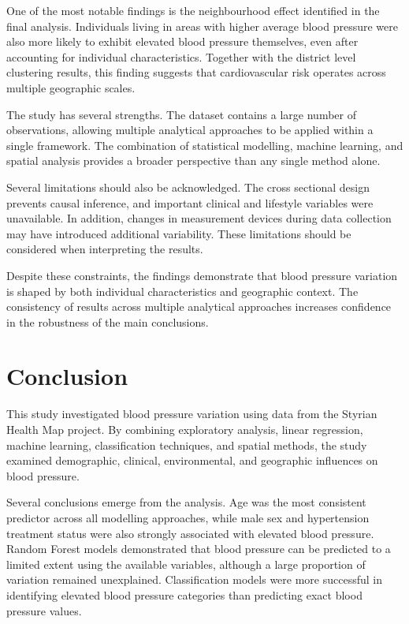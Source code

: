 \documentclass[12pt,a4paper]{article}
\begin{document}
One of the most notable findings is the neighbourhood effect identified in the final analysis. Individuals living in areas with higher average blood pressure were also more likely to exhibit elevated blood pressure themselves, even after accounting for individual characteristics. Together with the district level clustering results, this finding suggests that cardiovascular risk operates across multiple geographic scales.

The study has several strengths. The dataset contains a large number of observations, allowing multiple analytical approaches to be applied within a single framework. The combination of statistical modelling, machine learning, and spatial analysis provides a broader perspective than any single method alone.

Several limitations should also be acknowledged. The cross sectional design prevents causal inference, and important clinical and lifestyle variables were unavailable. In addition, changes in measurement devices during data collection may have introduced additional variability. These limitations should be considered when interpreting the results.

Despite these constraints, the findings demonstrate that blood pressure variation is shaped by both individual characteristics and geographic context. The consistency of results across multiple analytical approaches increases confidence in the robustness of the main conclusions.


\section{Conclusion}

This study investigated blood pressure variation using data from the Styrian Health Map project. By combining exploratory analysis, linear regression, machine learning, classification techniques, and spatial methods, the study examined demographic, clinical, environmental, and geographic influences on blood pressure.

Several conclusions emerge from the analysis. Age was the most consistent predictor across all modelling approaches, while male sex and hypertension treatment status were also strongly associated with elevated blood pressure. Random Forest models demonstrated that blood pressure can be predicted to a limited extent using the available variables, although a large proportion of variation remained unexplained. Classification models were more successful in identifying elevated blood pressure categories than predicting exact blood pressure values.
\end{document}
